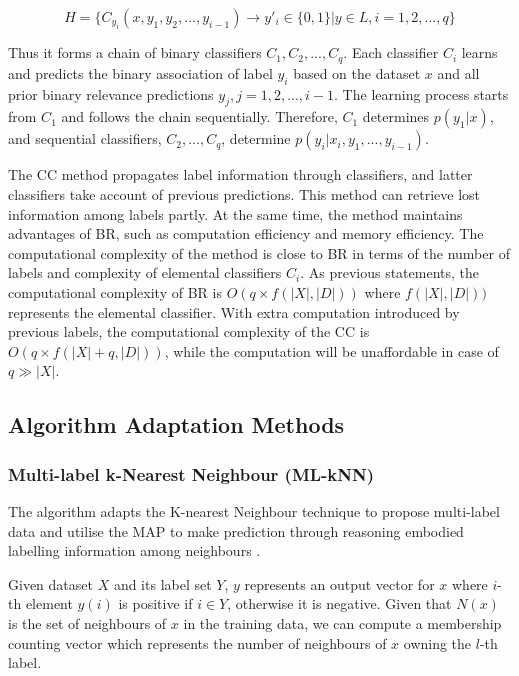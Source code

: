 \begin{equation}\label{eq:ClassifierChains}
H = \{C_{y_{i}}(x, y_{1},y_{2},...,y_{i-1}) \to y'_{i} \in \{0,1\}| y \in L, i = 1,2,...,q\}
\end{equation}

Thus it forms a chain of binary classifiers $C_{1},C_{2},...,C_{q}$. Each classifier $C_{i}$ learns and predicts the binary association of label $y_{i}$ based on the dataset $x$ and all prior binary relevance predictions $y_{j}, j = 1,2,...,i-1$. The learning process starts from $C_{1}$ and follows the chain sequentially. Therefore, $C_{1}$ determines $p(y_{1}|x)$, and sequential classifiers, $C_{2},...,C_{q}$, determine $p(y_{i}|x_{i},y_{1},...,y_{i-1})$.

The CC method propagates label information through classifiers, and latter classifiers take account of previous predictions. This method can retrieve lost information among labels partly. At the same time, the method maintains advantages of BR, such as computation efficiency and memory efficiency. The computational complexity of the method is close to BR in terms of the number of labels and complexity of elemental classifiers $C_{i}$. As previous statements, the computational complexity of BR is $O(q \times f(|X|,|D|))$ where $f(|X|,|D|))$ represents the elemental classifier. With extra computation introduced by previous labels, the computational complexity of the CC is $O(q \times f(|X|+q,|D|))$, while the computation will be unaffordable in case of $q \gg |X|$.

\subsection{Algorithm Adaptation Methods}

\subsubsection{Multi-label k-Nearest Neighbour (ML-kNN)}

The algorithm adapts the K-nearest Neighbour technique to propose multi-label data and utilise the MAP to make prediction through reasoning embodied labelling information among neighbours \citep{zhang2007ml}.

Given dataset $X$ and its label set $Y$, $y$ represents an output vector for $x$ where $i$-th element $y(i)$ is positive if $i \in Y$, otherwise it is negative. Given that $N(x)$ is the set of neighbours of $x$ in the training data, we can compute a membership counting vector which represents the number of neighbours of $x$ owning the $l$-th label.

